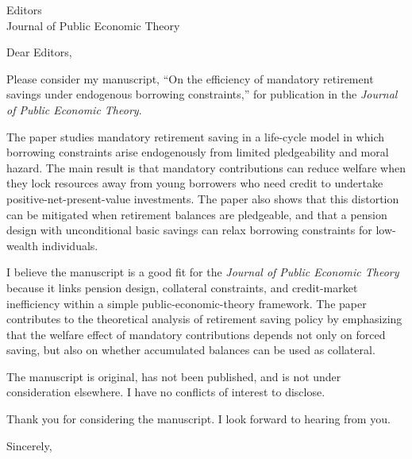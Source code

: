 \documentclass[11pt]{letter}
\begin{document}
\begin{letter}{Editors\\
Journal of Public Economic Theory}

\opening{Dear Editors,}

Please consider my manuscript, ``On the efficiency of mandatory retirement savings under endogenous borrowing constraints,'' for publication in the \textit{Journal of Public Economic Theory}.

The paper studies mandatory retirement saving in a life-cycle model in which borrowing constraints arise endogenously from limited pledgeability and moral hazard. The main result is that mandatory contributions can reduce welfare when they lock resources away from young borrowers who need credit to undertake positive-net-present-value investments. The paper also shows that this distortion can be mitigated when retirement balances are pledgeable, and that a pension design with unconditional basic savings can relax borrowing constraints for low-wealth individuals.

I believe the manuscript is a good fit for the \textit{Journal of Public Economic Theory} because it links pension design, collateral constraints, and credit-market inefficiency within a simple public-economic-theory framework. The paper contributes to the theoretical analysis of retirement saving policy by emphasizing that the welfare effect of mandatory contributions depends not only on forced saving, but also on whether accumulated balances can be used as collateral.

The manuscript is original, has not been published, and is not under consideration elsewhere. I have no conflicts of interest to disclose.

Thank you for considering the manuscript. I look forward to hearing from you.

\closing{Sincerely,}

\end{letter}
\end{document}
